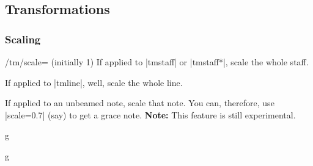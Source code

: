 \subsection{Transformations}\label{sec:custom:transformations}
\subsubsection{Scaling}\label{sec:custom:transformations:scale}
\begin{key}{/tm/scale= (initially 1)}
  If applied to |{tmstaff}| or |{tmstaff*}|, scale the whole staff.

  If applied to |{tmline}|, well, scale the whole line.

  If applied to an unbeamed note, scale that note. You can, therefore, use |scale=0.7| (say) 
  to get a grace note. \textbf{Note:} This feature is still experimental.
\end{key}
\begin{codeexample}[]
\begin{tmline}[scale=0.7]
\begin{tmstaff}{g}{}\end{tmstaff}%
\begin{tmstaff*}{}\end{tmstaff*}%
\end{tmline}%
\end{codeexample}
\begin{codeexample}[]
\begin{tmline}
\begin{tmstaff}{g}{}
\end{tmstaff}
\end{tmline}
\end{codeexample}
